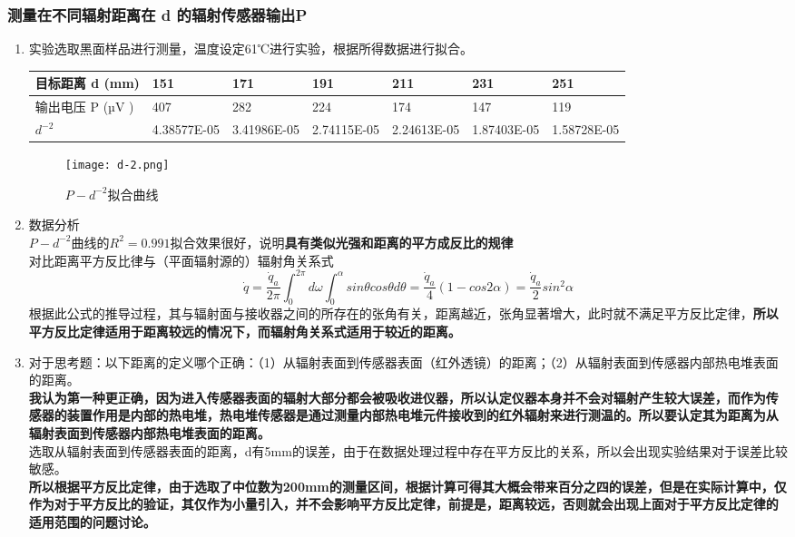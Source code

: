 \documentclass[dvipsnames, svgnames,a4paper,11pt]{article}
\begin{document}
	\subsubsection{测量在不同辐射距离在 d 的辐射传感器输出P}
	\begin{enumerate}
		\item 实验选取黑面样品进行测量，温度设定61℃进行实验，根据所得数据进行拟合。
		\begin{table}[!ht]
			\centering
			\begin{tabular}{|l|l|l|l|l|l|l|}
			\hline
				目标距离 d (mm) & 151 & 171 & 191 & 211 & 231 & 251  \\ \hline
				输出电压 P (µV )  & 407 & 282 & 224 & 174 & 147 & 119  \\ \hline
				$d^{-2}$& 4.38577E-05 & 3.41986E-05 & 2.74115E-05 & 2.24613E-05 & 1.87403E-05 & 1.58728E-05  \\ \hline
				
			\end{tabular}
		\end{table}
	
	
	\begin{figure}[{H}]
		\centering
		\texttt{[image: d-2.png]}
		\caption{$P-d^{-2}$拟合曲线}
		\label{}
	\end{figure}
	\item 数据分析\\
	$P-d^{-2}$曲线的$R^{2}=0.991$拟合效果很好，说明\textbf{具有类似光强和距离的平方成反比的规律}\\
	对比距离平方反比律与（平面辐射源的）辐射角关系式$$\dot{q}=\frac{\dot{q}_a}{2\pi}\int_0^{2\pi}d\omega\int_0^\alpha sin\theta cos\theta d\theta=\frac{\dot{q}_a}4(1-cos2\alpha)=\frac{\dot{q}_a}2sin^2\alpha $$
	根据此公式的推导过程，其与辐射面与接收器之间的所存在的张角有关，距离越近，张角显著增大，此时就不满足平方反比定律，\textbf{所以平方反比定律适用于距离较远的情况下，而辐射角关系式适用于较近的距离。}
	\item 对于思考题：以下距离的定义哪个正确：（1）从辐射表面到传感器表面（红外透镜）的距离；（2）从辐射表面到传感器内部热电堆表面的距离。\\
	\textbf{我认为第一种更正确，因为进入传感器表面的辐射大部分都会被吸收进仪器，所以认定仪器本身并不会对辐射产生较大误差，而作为传感器的装置作用是内部的热电堆，热电堆传感器是通过测量内部热电堆元件接收到的红外辐射来进行测温的。所以要认定其为距离为从辐射表面到传感器内部热电堆表面的距离。}\\
	选取从辐射表面到传感器表面的距离，d有5mm的误差，由于在数据处理过程中存在平方反比的关系，所以会出现实验结果对于误差比较敏感。\\
	\textbf{所以根据平方反比定律，由于选取了中位数为200mm的测量区间，根据计算可得其大概会带来百分之四的误差，但是在实际计算中，仅作为对于平方反比的验证，其仅作为小量引入，并不会影响平方反比定律，前提是，距离较远，否则就会出现上面对于平方反比定律的适用范围的问题讨论。}
	
	\end{enumerate}
\end{document}
